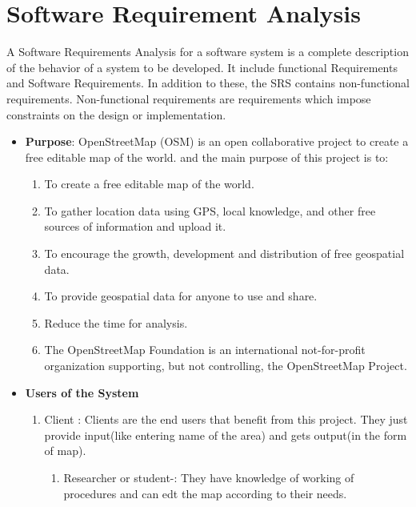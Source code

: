 
\section{Software Requirement Analysis}

A Software Requirements Analysis for a software system is a complete 
description of the behavior of a system to be developed. It include functional Requirements
and Software Requirements. In addition to these, the SRS contains 
non-functional requirements. Non-functional requirements are 
requirements which impose constraints on the design or implementation.
\begin{itemize}
\item{\bf Purpose}: OpenStreetMap (OSM) is an open collaborative project to  create a free editable map of the world. and the main purpose of this project is to:
\begin{enumerate}
\item  To  create a free editable map of the world.
\item To gather location data  using GPS, local knowledge, and other free sources of information and upload it.
\item  To encourage the growth, development and distribution of free geospatial data. 
\item  To provide geospatial data for anyone to use and share.
\item Reduce the time for analysis.
\item The OpenStreetMap Foundation is an international not-for-profit organization supporting, but not controlling, the OpenStreetMap Project.
\end{enumerate}

\item{\bf Users of the System}
\begin{enumerate} 
\item Client : Clients are the end users that benefit from this project.
They just provide input(like entering name of the area) and gets output(in the form of map).
\begin{enumerate}
\item Researcher or student-: They have knowledge of working of procedures and can edt the map according to their needs.  
\end{enumerate}
\end{enumerate}
\end{itemize}

